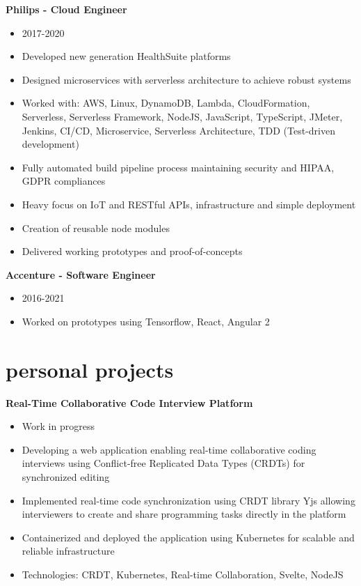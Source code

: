 \documentclass[]{friggeri-cv}
\begin{document}
\textbf{Philips - Cloud Engineer}
\begin{itemize}
  \item 2017-2020
  \item Developed new generation HealthSuite platforms
  \item Designed microservices with serverless architecture to achieve robust systems
  \item Worked with: AWS, Linux, DynamoDB, Lambda, CloudFormation, Serverless, Serverless Framework, NodeJS, JavaScript, TypeScript, JMeter, Jenkins, CI/CD, Microservice, Serverless Architecture, TDD (Test-driven development)
  \item Fully automated build pipeline process maintaining security and HIPAA, GDPR compliances
  \item Heavy focus on IoT and RESTful APIs, infrastructure and simple deployment
  \item Creation of reusable node modules
  \item Delivered working prototypes and proof-of-concepts
\end{itemize}

\textbf{Accenture - Software Engineer}
\begin{itemize}
  \item 2016-2021
  \item Worked on prototypes using Tensorflow, React, Angular 2
\end{itemize}

\section{personal projects}

\textbf{Real-Time Collaborative Code Interview Platform}
\begin{itemize}
  \item Work in progress
  \item Developing a web application enabling real-time collaborative coding interviews using Conflict-free Replicated Data Types (CRDTs) for synchronized editing
  \item Implemented real-time code synchronization using CRDT library Yjs allowing interviewers to create and share programming tasks directly in the platform
  \item Containerized and deployed the application using Kubernetes for scalable and reliable infrastructure
  \item Technologies: CRDT, Kubernetes, Real-time Collaboration, Svelte, NodeJS
\end{itemize}
\end{document}
